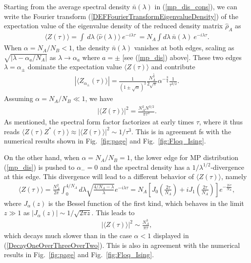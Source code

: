 \documentclass[aps,prb,preprint,onecolumn,amsmath,amssymb,superscriptaddress,eqsecnum,floatfix,scrartcl]{revtex4-1}
\begin{document}
Starting from  the average spectral density
$\bar{n}(\lambda)$
 in (\ref{mp_dis_cons}), we can 
write the Fourier transform (\ref{DEFFourierTransformEigenvalueDensity}) of the expectation value of the eigenvalue density of the 
reduced density matrix ${\hat \rho}_A$  as
\begin{align}
\langle Z(\tau)\rangle=
\int \ d\lambda \ 
\langle{\hat \nu}(\lambda)\rangle 
\ e^{-i\lambda \tau}\ =
N_A\int d\lambda  \
\bar{n}(\lambda) \ 
e^{-i\lambda\tau}.
\end{align}
When $\alpha=N_A/N_B<1$,  the density $\bar{n}(\lambda)$ vanishes at both edges, 
scaling 
as $\sqrt{|\lambda-\alpha_{
a}/N_A|}$
as $\lambda \to \alpha_a$ where $a=\pm$ [see (\ref{mp_dis}) above]. These two edges 
$\lambda=\alpha_{\pm}$ dominate the expectation value $\langle Z(\tau)\rangle$ and contribute 
\begin{align}
|\langle Z_{\alpha_{\pm}}(\tau)\rangle|=\frac{1}{(1\pm\sqrt{\alpha})^2}\frac{N_A^{\frac{5}{2}}}{2\sqrt{\pi}}\alpha^{-\frac{3}{4}}\frac{1}{\tau^{3/2}}.
\end{align}
Assuming $\alpha = N_A/N_B \ll 1$, we have
\begin{align}
\label{DecayOneOverThreeOverTwo}
|\langle Z(\tau)\rangle|^2=\frac{N_A^2N^{3/2}}{\pi \tau^3}.
\end{align}
As mentioned, 
the spectral form factor factorizes at early times $\tau$, 
where it thus reads 
 $\langle Z(\tau)Z^*(\tau)\rangle\approx|\langle Z(\tau)\rangle|^2\sim 1/\tau^3$. This is 
in agreement fs with the numerical results shown  in Fig.~\ref{fig:page} and Fig.~\ref{fig:Floq_Ising}.

On the other hand, when $\alpha=N_A/N_B=1$, the lower edge for MP distribution (\ref{mp_dis})
 is pushed to $\alpha_-=0$ and the spectral density has  a 
$1/\lambda^{1/2}$-divergence at this edge. This divergence will lead to a different 
behavior of $\langle Z(\tau)\rangle$, namely
\begin{align}
\langle Z(\tau)\rangle=\frac{N_A^2}{2\pi}\int_0^{4/N_A}d\lambda\sqrt{\frac{4/N_A-\lambda}{\lambda}}e^{-i\lambda\tau}=N_A\left[J_0(\frac{2\tau}{N_A})+iJ_1(\frac{2\tau}{N_A})\right]e^{-\frac{2i\tau}{N_A}},
\end{align}
where $J_\alpha(z)$ is the Bessel function of the first kind,
which behaves
 in the limit $z\gg 1$
as  $|J_\alpha(z)|\sim 1/\sqrt{2\pi z}$. This  leads
 to 
\begin{align}
\label{ZtauModSquaredForAlphaEuqalZero}
|\langle Z(\tau)\rangle|^2\sim\frac{N_A^3}{\pi\tau},
\end{align}
which 
decays much slower than  in the case   $\alpha <1$ displayed in (\ref{DecayOneOverThreeOverTwo}). 
This is also 
in agreement with the numerical results in Fig.~\ref{fig:page} and Fig.~\ref{fig:Floq_Ising}.
\end{document}
